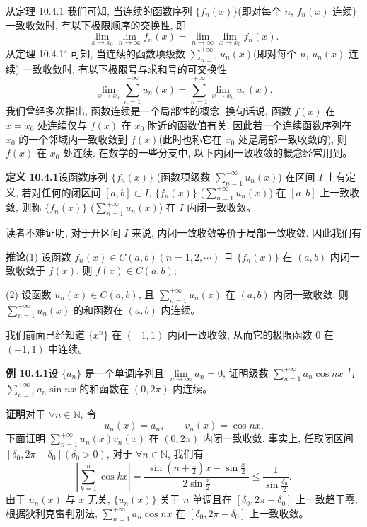 \documentclass[UTF8, 12pt, fontset=fandol, oneside]{ctexart}
\begin{document}
从定理 10.4.1 我们可知, 当连续的函数序列 $\{f_n(x)\}$(即对每个 $n$, $f_n(x)$ 连续) 一致收敛时, 有以下极限顺序的交换性, 即
\[
  \lim_{x\to x_0}\lim_{n\to\infty}f_n(x)
  =\lim_{n\to\infty}\lim_{x\to x_0}f_n(x).
\]
从定理 10.4.1$'$ 可知, 当连续的函数项级数 $\sum\limits_{n=1}^{+\infty}u_n(x)$(即对每个 $n$, $u_n(x)$ 连续) 一致收敛时, 有以下极限号与求和号的可交换性
\[
  \lim_{x\to x_0}\sum_{n=1}^{+\infty}u_n(x)
  =\sum_{n=1}^{+\infty}\lim_{x\to x_0}u_n(x).
\]
我们曾经多次指出, 函数连续是一个局部性的概念. 换句话说, 函数 $f(x)$ 在 $x=x_0$ 处连续仅与 $f(x)$ 在 $x_0$ 附近的函数值有关. 因此若一个连续函数序列在 $x_0$ 的一个邻域内一致收敛到 $f(x)$(此时也称它在 $x_0$ 处是局部一致收敛的), 则 $f(x)$ 在 $x_0$ 处连续. 在数学的一些分支中, 以下内闭一致收敛的概念经常用到。

\noindent\textbf{定义 10.4.1}\quad 设函数序列 $\{f_n(x)\}$ (函数项级数 $\sum\limits_{n=1}^{+\infty}u_n(x)$) 在区间 $I$ 上有定义, 若对任何的闭区间 $[a,b]\subset I$, $\{f_n(x)\}$ ($\sum\limits_{n=1}^{+\infty}u_n(x)$) 在 $[a,b]$ 上一致收敛, 则称 $\{f_n(x)\}$ ($\sum\limits_{n=1}^{+\infty}u_n(x)$) 在 $I$ 内闭一致收敛。

读者不难证明, 对于开区间 $I$ 来说, 内闭一致收敛等价于局部一致收敛. 因此我们有

\noindent\textbf{推论}\quad (1) 设函数 $f_n(x)\in C(a,b)(n=1,2,\cdots)$ 且 $\{f_n(x)\}$ 在 $(a,b)$ 内闭一致收敛于 $f(x)$, 则 $f(x)\in C(a,b)$;

(2) 设函数 $u_n(x)\in C(a,b)$, 且 $\sum\limits_{n=1}^{+\infty}u_n(x)$ 在 $(a,b)$ 内闭一致收敛, 则 $\sum\limits_{n=1}^{+\infty}u_n(x)$ 的和函数在 $(a,b)$ 内连续。

我们前面已经知道 $\{x^n\}$ 在 $(-1,1)$ 内闭一致收敛, 从而它的极限函数 $0$ 在 $(-1,1)$ 中连续。

\noindent\textbf{例 10.4.1}\quad 设 $\{a_n\}$ 是一个单调序列且 $\lim\limits_{n\to\infty}a_n=0$, 证明级数 $\sum\limits_{n=1}^{+\infty}a_n\cos nx$ 与 $\sum\limits_{n=1}^{+\infty}a_n\sin nx$ 的和函数在 $(0,2\pi)$ 内连续。

\noindent\textbf{证明}\quad 对于 $\forall n\in\mathbb N$, 令
\[
  u_n(x)=a_n,\qquad v_n(x)=\cos nx.
\]
下面证明 $\sum\limits_{n=1}^{+\infty}u_n(x)v_n(x)$ 在 $(0,2\pi)$ 内闭一致收敛. 事实上, 任取闭区间 $[\delta_0,2\pi-\delta_0](\delta_0>0)$, 对于 $\forall n\in\mathbb N$, 我们有
\[
  \left|\sum_{k=1}^n\cos kx\right|
  =\frac{\left|\sin\left(n+\frac12\right)x-\sin\frac{x}{2}\right|}{2\sin\frac{x}{2}}
  \leq\frac1{\sin\frac{\delta_0}{2}}.
\]
由于 $u_n(x)$ 与 $x$ 无关, $\{u_n(x)\}$ 关于 $n$ 单调且在 $[\delta_0,2\pi-\delta_0]$ 上一致趋于零, 根据狄利克雷判别法, $\sum\limits_{n=1}^{+\infty}a_n\cos nx$ 在 $[\delta_0,2\pi-\delta_0]$ 上一致收敛。
\end{document}
